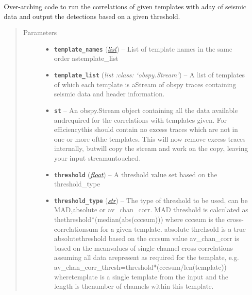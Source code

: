 \documentclass[a4paper,10pt,english]{sphinxmanual}
\begin{document}
\begin{fulllineitems}
\label{submodules/core.match_filter:match_filter.match_filter}
Over-arching code to run the correlations of given templates with aday of seismic data and output the detections based on a given threshold.
\begin{quote}\begin{description}
\item[{Parameters}] \leavevmode\begin{itemize}
\item {} 
\textbf{\texttt{template\_names}} (\href{https://docs.python.org/library/functions.html\#list}{\emph{list}}) -- List of template names in the same order astemplate\_list

\item {} 
\textbf{\texttt{template\_list}} (\emph{list :class: `obspy.Stream'}) -- A list of templates of which each template is aStream of obspy traces containing seismic data and header information.

\item {} 
\textbf{\texttt{st}} -- An obspy.Stream object containing all the data available andrequired for the correlations with templates given.  For efficiencythis should contain no excess traces which are not in one or more ofthe templates.  This will now remove excess traces internally, butwill copy the stream and work on the copy, leaving your input streamuntouched.

\item {} 
\textbf{\texttt{threshold}} (\href{https://docs.python.org/library/functions.html\#float}{\emph{float}}) -- A threshold value set based on the threshold\_type

\item {} 
\textbf{\texttt{threshold\_type}} (\href{https://docs.python.org/library/functions.html\#str}{\emph{str}}) -- The type of threshold to be used, can be MAD,absolute or av\_chan\_corr.    MAD threshold is calculated as thethreshold*(median(abs(cccsum))) where cccsum is the cross-correlationsum for a given template. absolute threhsold is a true absolutethreshold based on the cccsum value av\_chan\_corr is based on the meanvalues of single-channel cross-correlations assuming all data arepresent as required for the template, e.g. av\_chan\_corr\_thresh=threshold*(cccsum/len(template)) wheretemplate is a single template from the input and the length is thenumber of channels within this template.


\end{itemize}
\end{description}
\end{quote}
\end{fulllineitems}
\end{document}

